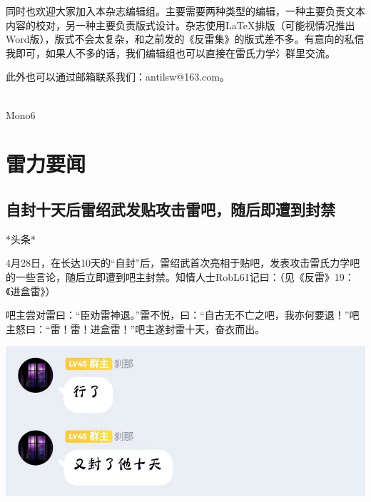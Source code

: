 \documentclass[UTF8,12pt,oneside]{ctexbook}
\begin{document}
    同时也欢迎大家加入本杂志编辑组。主要需要两种类型的编辑，一种主要负责文本内容的校对，另一种主要负责版式设计。杂志使用LaTeX排版（可能视情况推出Word版），版式不会太复杂，和之前发的《反雷集》的版式差不多。有意向的私信我即可，如果人不多的话，我们编辑组也可以直接在雷氏力学氵群里交流。
    
    此外也可以通过邮箱联系我们：antilsw@163.com。
    
    \begin{flushright}
        ~\\
        Mono6
    \end{flushright}
    
    \tableofcontents    

    \clearpage
    
    \chapter{雷力要闻}
        
        \section{自封十天后雷绍武发贴攻击雷吧，随后即遭到封禁}
        
        \begin{center}
            \LARGE
            \kaishu
            *头条*
            \songti
        \end{center}
        
        \large
        4月28日，在长达10天的“自封”后，雷绍武首次亮相于贴吧，发表攻击雷氏力学吧的一些言论，随后立即遭到吧主封禁。知情人士RobL61记曰：（见《反雷》19：《进盒雷》）
        
        吧主尝对雷曰：“臣劝雷神退。”雷不悦，曰：“自古无不亡之吧，我亦何要退！”吧主怒曰：“雷！雷！进盒雷！”吧主遂封雷十天，奋衣而出。
        
        \begin{center}
            
            \includegraphics[scale=0.3]{WechatIMG347.jpeg}
        \end{center}
        
\end{document}
